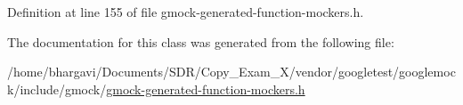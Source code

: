 Definition at line 155 of file gmock-\/generated-\/function-\/mockers.\+h.



The documentation for this class was generated from the following file\+:\begin{DoxyCompactItemize}
\item 
/home/bhargavi/\+Documents/\+S\+D\+R/\+Copy\+\_\+\+Exam\+\_\+X/vendor/googletest/googlemock/include/gmock/\hyperlink{gmock-generated-function-mockers_8h}{gmock-\/generated-\/function-\/mockers.\+h}\end{DoxyCompactItemize}
